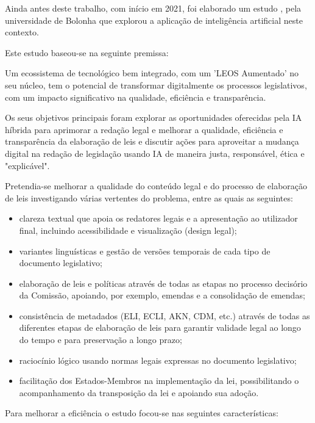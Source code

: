 Ainda antes deste trabalho, com início em 2021, foi elaborado um estudo \cite{PFPD22}, 
pela universidade de Bolonha que explorou a aplicação de inteligência artificial neste contexto.

Este estudo baseou-se na seguinte premissa:

\begin{quoting}
    Um ecossistema de tecnológico bem integrado, com um 'LEOS Aumentado' no seu núcleo, 
    tem o potencial de transformar digitalmente os processos legislativos, com um impacto 
    significativo na qualidade, eficiência e transparência.
\end{quoting}

Os seus objetivos principais foram explorar as oportunidades oferecidas pela IA híbrida para aprimorar 
a redação legal e melhorar a qualidade, eficiência e transparência da elaboração de leis e discutir 
ações para aproveitar a mudança digital na redação de legislação usando IA de maneira justa, 
responsável, ética e "explicável". 

Pretendia-se melhorar a qualidade do conteúdo legal e do processo de elaboração de leis 
investigando várias vertentes do problema, entre as quais as seguintes:

\begin{itemize}

\item clareza textual que apoia os redatores legais e a apresentação ao utilizador final, 
incluindo acessibilidade e visualização (design legal);
\item variantes linguísticas e gestão de versões temporais de cada tipo de documento legislativo;
\item elaboração de leis e políticas através de todas as etapas no processo decisório da Comissão, 
apoiando, por exemplo, emendas e a consolidação de emendas;
\item consistência de metadados (ELI, ECLI, AKN, CDM, etc.) através de todas as diferentes etapas 
de elaboração de leis para garantir validade legal ao longo do tempo e para preservação a longo prazo;
\item raciocínio lógico usando normas legais expressas no documento legislativo; 
\item facilitação dos Estados-Membros na implementação da lei, possibilitando o acompanhamento da 
transposição da lei e apoiando sua adoção.

\end{itemize}

Para melhorar a eficiência o estudo focou-se nas seguintes características:

